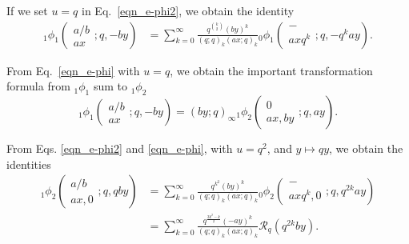 \documentclass{cimart}
\newcommand{\RR}{\mathcal{R}}
\begin{document}
\begin{corollary}
If we set $u=q$ in Eq.~\eqref{eqn_e-phi2}, we obtain the identity
\begin{align}
    {}_{1}\phi_{1}\left(
    \begin{array}{c}
         a/b\\
         ax
    \end{array}
    ;q,-by
    \right)&=\sum_{k=0}^{\infty}\frac{q^{\binom{k}{2}}(by)^k}{(q;q)_{k}(ax;q)_{k}}{}_{0}\phi_{1}\left(
        \begin{array}{c}
             - \\
             axq^k
        \end{array};
        q,-q^kay
        \right).
\end{align}
\end{corollary}

\begin{corollary}
From Eq.~\eqref{eqn_e-phi} with $u=q$, we obtain the important transformation formula from ${}_{1}\phi_{1}$ sum to ${}_{1}\phi_{2}$
    \begin{equation}
        {}_{1}\phi_{1}\left(
    \begin{array}{c}
         a/b\\
         ax
    \end{array}
    ;q,-by
    \right)=(by;q)_{\infty}{}_{1}\phi_{2}\left(
    \begin{array}{c}
         0\\
         ax,by
    \end{array}
    ;q,ay
    \right).    
    \end{equation}
\end{corollary}

\begin{corollary}
From Eqs. \eqref{eqn_e-phi2} and \eqref{eqn_e-phi}, with $u=q^2$, and $y\mapsto qy$, we obtain the identities
\begin{align*}
    {}_{1}\phi_{2}\left(
    \begin{array}{c}
         a/b\\
         ax,0
    \end{array}
    ;q,qby
    \right)&=\sum_{k=0}^{\infty}\frac{q^{k^2}(by)^k}{(q;q)_{k}(ax;q)_{k}}{}_{0}\phi_{2}\left(
        \begin{array}{c}
             - \\
             axq^k,0
        \end{array};
        q,q^{2k}ay
        \right)\\
        &=\sum_{k=0}^{\infty}\frac{q^{\frac{3k^2-k}{2}}(-ay)^k}{(q;q)_{k}(ax;q)_{k}}\RR_{q}(q^{2k}by).
\end{align*}
\end{corollary}
\end{document}
